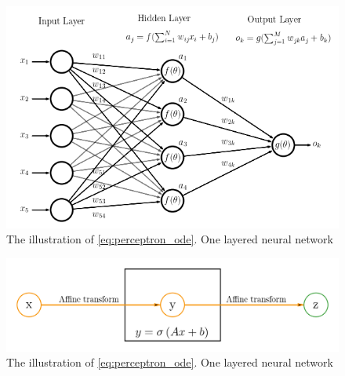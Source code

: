\begin{figure}[h]
	\centering
	\includegraphics[width=\textwidth]{images/chapter2/neural_network_fcn.png}
	\caption{The illustration of \eqref{eq:perceptron_ode}. One layered neural network}
	\label{fig:simple_net}
\end{figure}

\begin{figure}[h]
	\centering
	\includegraphics[width=\textwidth]{images/chapter2/simple_net.png}
	\caption{The illustration of \eqref{eq:perceptron_ode}. One layered neural network}
	\label{fig:simple_net}
\end{figure}


